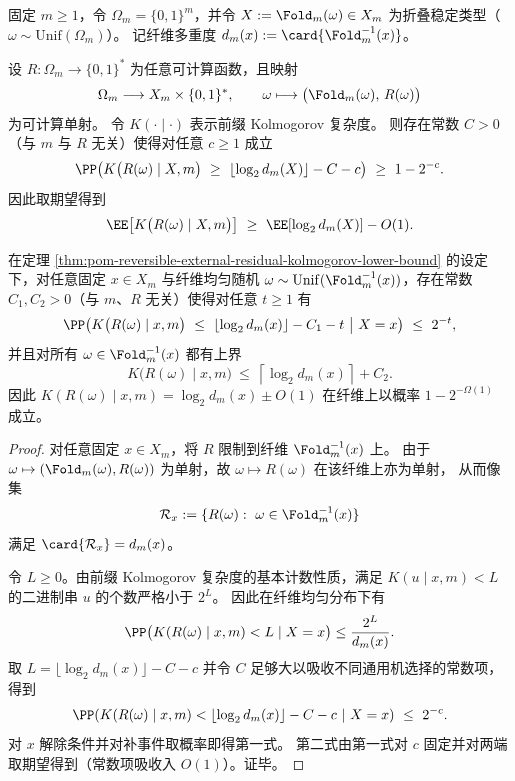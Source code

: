 \begin{theorem}\label{thm:pom-reversible-external-residual-kolmogorov-lower-bound}
固定 \(m\ge 1\)，令 \(\Omega_m=\{0,1\}^m\)，并令 \(X:=\Fold_m(\omega)\in X_m\) 为折叠稳定类型（\(\omega\sim\mathrm{Unif}(\Omega_m)\)）。
记纤维多重度 \(d_m(x):=\card{\Fold_m^{-1}(x)}\)。
\par
设 \(R:\Omega_m\to\{0,1\}^{\ast}\) 为任意可计算函数，且映射
\[
\Omega_m\longrightarrow X_m\times \{0,1\}^{\ast},
\qquad
\omega\longmapsto \bigl(\Fold_m(\omega),\,R(\omega)\bigr)
\]
为可计算单射。
令 \(K(\cdot\mid\cdot)\) 表示前缀 Kolmogorov 复杂度。
则存在常数 \(C>0\)（与 \(m\) 与 \(R\) 无关）使得对任意 \(c\ge 1\) 成立
\[
\PP\!\left(
K\bigl(R(\omega)\mid X,m\bigr)
\ \ge\
\left\lfloor \log_2 d_m(X)\right\rfloor-C-c
\right)\ \ge\ 1-2^{-c}.
\]
因此取期望得到
\[
\EE\!\left[K\bigl(R(\omega)\mid X,m\bigr)\right]
\ \ge\
\EE\!\left[\log_2 d_m(X)\right]-O(1).
\]
\end{theorem}

\begin{corollary}[纤维内的两侧最优性：\texorpdfstring{$K(R\mid x,m)$}{K} 与 \texorpdfstring{$\log d_m(x)$}{log d} 一致]\label{cor:pom-reversible-external-residual-kolmogorov-typical-equality}
在定理 \ref{thm:pom-reversible-external-residual-kolmogorov-lower-bound} 的设定下，对任意固定 \(x\in X_m\) 与纤维均匀随机 \(\omega\sim \mathrm{Unif}(\Fold_m^{-1}(x))\)，存在常数 \(C_1,C_2>0\)（与 \(m\)、\(R\) 无关）使得对任意 \(t\ge 1\) 有
\[
\PP\!\left(
K\bigl(R(\omega)\mid x,m\bigr)\ \le\ \left\lfloor \log_2 d_m(x)\right\rfloor-C_1-t
\ \middle|\ X=x
\right)\ \le\ 2^{-t},
\]
并且对所有 \(\omega\in\Fold_m^{-1}(x)\) 都有上界
\[
K\bigl(R(\omega)\mid x,m\bigr)\ \le\ \left\lceil \log_2 d_m(x)\right\rceil+C_2.
\]
因此 \(K(R(\omega)\mid x,m)=\log_2 d_m(x)\pm O(1)\) 在纤维上以概率 \(1-2^{-\Omega(1)}\) 成立。
\end{corollary}

\begin{proof}
对任意固定 \(x\in X_m\)，将 \(R\) 限制到纤维 \(\Fold_m^{-1}(x)\) 上。
由于 \(\omega\mapsto(\Fold_m(\omega),R(\omega))\) 为单射，故 \(\omega\mapsto R(\omega)\) 在该纤维上亦为单射，
从而像集
\[
\mathcal R_x:=\{R(\omega):\ \omega\in\Fold_m^{-1}(x)\}
\]
满足 \(\card{\mathcal R_x}=d_m(x)\)。
\par
令 \(L\ge 0\)。由前缀 Kolmogorov 复杂度的基本计数性质，满足
\(
K(u\mid x,m)<L
\)
的二进制串 \(u\) 的个数严格小于 \(2^{L}\)。
因此在纤维均匀分布下有
\[
\PP\bigl(K(R(\omega)\mid x,m)<L\mid X=x\bigr)
\le \frac{2^{L}}{d_m(x)}.
\]
取
\(
L=\lfloor \log_2 d_m(x)\rfloor-C-c
\)
并令 \(C\) 足够大以吸收不同通用机选择的常数项，得到
\[
\PP\!\left(
K(R(\omega)\mid x,m)
<
\lfloor \log_2 d_m(x)\rfloor-C-c
\ \middle|\ X=x
\right)\ \le\ 2^{-c}.
\]
对 \(x\) 解除条件并对补事件取概率即得第一式。
第二式由第一式对 \(c\) 固定并对两端取期望得到（常数项吸收入 \(O(1)\)）。证毕。
\end{proof}

